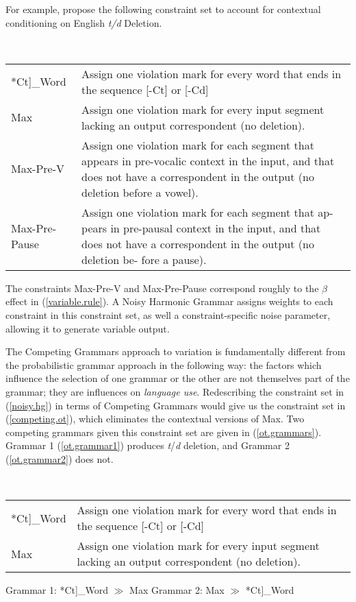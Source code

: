 For example, \citet{Coetzee2012} propose the following constraint set to account for contextual conditioning on English {\it t/d} Deletion.
\begin{exe}
	\ex \label{noisy.hg}\  \\
\begin{tabular}{lp{3in}}
	*{\sc Ct}]_{Word}& Assign one violation mark for every word that ends in the sequence [-Ct] or [-Cd]\\
	{\sc Max} & Assign one violation mark for every input segment lacking an output correspondent (no deletion).\\
	{\sc Max-Pre-V} & Assign one violation mark for each segment that appears in pre-vocalic context in the input, and that does not have a correspondent in the output (no deletion before a vowel).\\
	{\sc Max-Pre-Pause} &Assign one violation mark for each segment that ap- pears in pre-pausal context in the input, and that does not have a correspondent in the output (no deletion be- fore a pause).
\end{tabular}
\end{exe}
The constraints {\sc Max-Pre-V} and {\sc Max-Pre-Pause} correspond roughly to the $\beta$ effect in (\ref{variable.rule}). 
A Noisy Harmonic Grammar assigns weights to each constraint in this constraint set, as well a constraint-specific noise parameter, allowing it to generate variable output.

The Competing Grammars approach to variation is fundamentally different from the probabilistic grammar approach in the following way: the factors which influence the selection of one grammar or the other are not themselves part of the grammar; they are influences on \textsl{language use}.
Redescribing the constraint set in (\ref{noisy.hg}) in terms of Competing Grammars would give us the constraint set in (\ref{competing.ot}), which eliminates the contextual versions of {\sc Max}.
Two competing grammars given this constraint set are given in (\ref{ot.grammars}).
Grammar 1 (\ref{ot.grammar1}) produces {\sl t}/{\sl d} deletion, and Grammar 2 (\ref{ot.grammar2}) does not.
\begin{exe}
	\ex \label{competing.ot}\ \\
	\begin{tabular}{lp{3in}}
	*{\sc Ct}]_{Word}& Assign one violation mark for every word that ends in the sequence [-Ct] or [-Cd]\\
	{\sc Max} & Assign one violation mark for every input segment lacking an output correspondent (no deletion).
	\end{tabular}
	\ex \label{ot.grammars}
		\begin{xlist}
			\ex Grammar 1: *{\sc Ct}]_{Word} $\gg$ {\sc Max} \label{ot.grammar1}
			\ex Grammar 2: {\sc Max} $\gg$ *{\sc Ct}]_{Word} \label{ot.grammar2}
		\end{xlist}
\end{exe}

